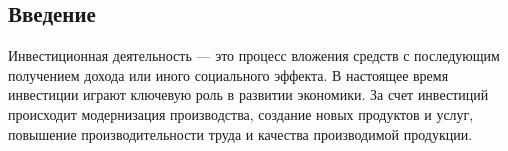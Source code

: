 \subsection*{Введение}

Инвестиционная деятельность --- это процесс вложения средств с последующим получением дохода или иного социального эффекта. В настоящее время инвестиции играют ключевую роль в развитии экономики. За счет инвестиций происходит модернизация производства, создание новых продуктов и услуг, повышение производительности труда и качества производимой продукции.










